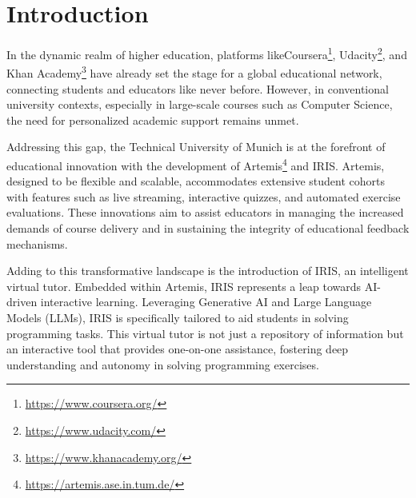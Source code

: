 \documentclass[a4paper,12pt,twoside]{article}
\begin{document}
\setlength{\evensidemargin}{22pt}
\setlength{\oddsidemargin}{22pt}



\lstset{showspaces=false, numbers=left, frame=single, basicstyle=\small}



\fancyhead{}
\pagestyle{fancy}
\fancyhead[LE]{\slshape \leftmark}
\fancyhead[RO]{\slshape \rightmark}
\headheight=15pt

\section{Introduction}
            
            In the dynamic realm of higher education, platforms likeCoursera\footnote{\url{https://www.coursera.org/}}, Udacity\footnote{\url{https://www.udacity.com/}}, and Khan Academy\footnote{\url{https://www.khanacademy.org/}} have already set the stage for a global educational network, connecting students and educators like never before. However, in conventional university contexts, especially in large-scale courses such as Computer Science, the need for personalized academic support remains unmet.
            
            Addressing this gap, the Technical University of Munich is at the forefront of educational innovation with the development of Artemis\footnote{\url{https://artemis.ase.in.tum.de/}} and IRIS. Artemis, designed to be flexible and scalable, accommodates extensive student cohorts with features such as live streaming, interactive quizzes, and automated exercise evaluations.\cite{3} These innovations aim to assist educators in managing the increased demands of course delivery and in sustaining the integrity of educational feedback mechanisms.\cite{4}
            
            Adding to this transformative landscape is the introduction of IRIS, an intelligent virtual tutor. Embedded within Artemis, IRIS represents a leap towards AI-driven interactive learning. Leveraging Generative AI and Large Language Models (LLMs), IRIS is specifically tailored to aid students in solving programming tasks. This virtual tutor is not just a repository of information but an interactive tool that provides one-on-one assistance, fostering deep understanding and autonomy in solving programming exercises. 
            
\end{document}
